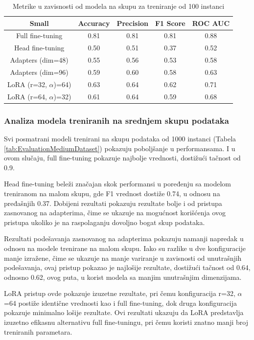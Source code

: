 \documentclass[12pt,oneside]{memoir}
\begin{document}
\begin{table}[h!]
	\centering
	\setlength{\tabcolsep}{12pt}
	\renewcommand{\arraystretch}{1.5}
	\begin{tabular}{|c|c|c|c|c|} 
		\hline
		\textbf{Small} & \textbf{Accuracy} & \textbf{Precision} & \textbf{F1 Score} & \textbf{ROC AUC}  \\
		\hline
		Full fine-tuning     & 0.81 & 0.81 & 0.81 & 0.88 \\ 
		Head fine-tuning     & 0.50 & 0.51 & 0.37 & 0.52 \\ 
		Adapters (dim=48)  & 0.55 & 0.56 & 0.53 & 0.58 \\ 
		Adapters (dim=96)  & 0.59 & 0.60 & 0.58 & 0.63 \\ 
		LoRA (r=32, \(\alpha\))=64)    & 0.63 & 0.64 & 0.62 & 0.71 \\ 
		LoRA (r=64, \(\alpha\))=32)    & 0.61 & 0.64 & 0.59 & 0.68 \\ 
		\hline
	\end{tabular}
	\caption{Metrike u zavisnosti od modela na skupu za treniranje od 100 instanci}
	\label{tab:EvaluationSmallDataset}
\end{table}

\subsubsection{Analiza modela treniranih na srednjem skupu podataka}
Svi posmatrani modeli trenirani na skupu podataka od 1000 instanci (Tabela \ref{tab:EvaluationMediumDataset}) pokazuju poboljšanje u performansama. I u ovom slučaju, full fine-tuning pokazuje najbolje vrednosti, dostižući tačnost od 0.9.

Head fine-tuning beleži značajan skok performansi u poređenju sa modelom treniranom na malom skupu, gde F1 vrednost dostiže 0.74, u odnosu na pređašnjih 0.37. Dobijeni rezultati pokazuju rezultate bolje i od pristupa zasnovanog na adapterima, čime se ukazuje na mogućnost korišćenja ovog pristupa ukoliko je na raspolaganju dovoljno bogat skup podataka.

Rezultati podešavanja zasnovanog na adapterima pokazuju namanji napredak u odnosu na modele trenirane na malom skupu. Iako su razlike u dve konfiguracije manje izražene, čime se ukazuje na manje variranje u zavisnosti od unutrašnjih podešavanja, ovaj pristup pokazao je najlošije rezultate, dostižući tačnost od 0.64, odnosno 0.62, ovog puta, u korist modela sa manjim unutrašnjim dimenzijama.

LoRA pristup ovde pokazuje izuzetne rezultate, pri čemu konfiguracija r=32, \(\alpha\)=64  postiže identične vrednosti kao i full fine-tuning, dok druga konfiguracija pokazuje minimalno lošije rezultate. Ovi rezultati ukazuju da LoRA predstavlja izuzetno efikasnu alternativu full fine-tuningu, pri čemu koristi znatno manji broj treniranih parametara.
\end{document}
